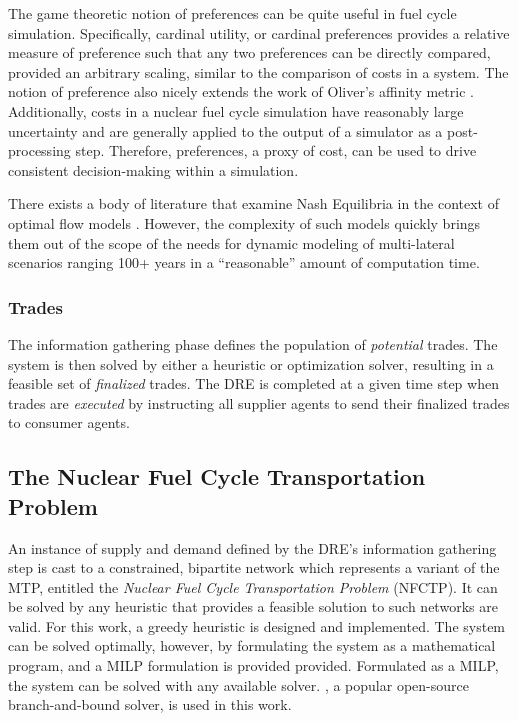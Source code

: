 The game theoretic notion of preferences can be quite useful in fuel cycle
simulation. Specifically, cardinal utility, or cardinal preferences
\cite{strotz_cardinal_1953} provides a relative measure of preference such that
any two preferences can be directly compared, provided an arbitrary scaling,
similar to the comparison of costs in a system. The notion of preference also
nicely extends the work of Oliver's affinity metric
\cite{oliver_geniusv2:_2009}. Additionally, costs in a nuclear fuel cycle
simulation have reasonably large uncertainty \cite{shropshire_advanced_2009} and
are generally applied to the output of a simulator as a post-processing
step. Therefore, preferences, a proxy of cost, can be used to drive consistent
decision-making within a simulation.

There exists a body of literature that examine Nash Equilibria in the context of
optimal flow models
\cite{mazumdar_fairness_1991,nagurney_supply_2002,song_nash_2002}. However, the
complexity of such models quickly brings them out of the scope of the needs for
dynamic modeling of multi-lateral scenarios ranging 100+ years in a
``reasonable'' amount of computation time.

\subsubsection{Trades}

The information gathering phase defines the population of \textit{potential}
trades. The system is then solved by either a heuristic or optimization solver,
resulting in a feasible set of \textit{finalized} trades. The DRE is completed
at a given time step when trades are \textit{executed} by instructing all
supplier agents to send their finalized trades to consumer agents.

\subsection{The Nuclear Fuel Cycle Transportation Problem}\label{abm:dre:fctp}

An instance of supply and demand defined by the DRE's information gathering step
is cast to a constrained, bipartite network which represents a variant of the
MTP, entitled the \textit{Nuclear Fuel Cycle Transportation Problem} (NFCTP). It
can be solved by any heuristic that provides a feasible solution to such
networks are valid.  For this work, a greedy heuristic is designed and
implemented. The system can be solved optimally, however, by formulating the
system as a mathematical program, and a MILP formulation is provided
provided. Formulated as a MILP, the system can be solved with any available
solver. \cbc\cite{forrestcbc}, a popular open-source branch-and-bound solver, is
used in this work.


